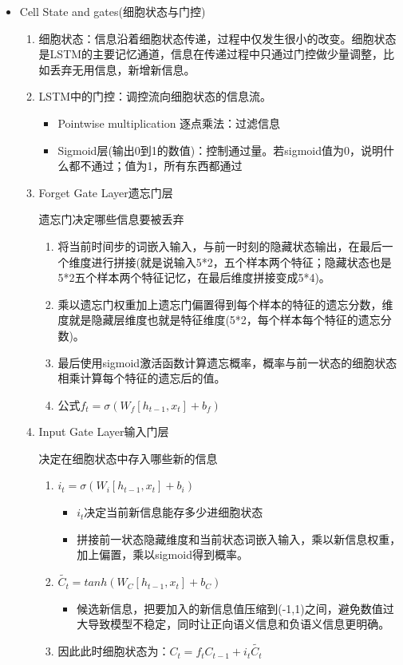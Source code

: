 \documentclass[UTF8]{ctexart}
\begin{document}
\begin{itemize}
    \item Cell State and gates(细胞状态与门控)
    
    \begin{enumerate}
        \item 细胞状态：信息沿着细胞状态传递，过程中仅发生很小的改变。细胞状态是LSTM的主要记忆通道，信息在传递过程中只通过门控做少量调整，比如丢弃无用信息，新增新信息。
        \item LSTM中的门控：调控流向细胞状态的信息流。
        \begin{itemize}
            \item Pointwise multiplication 逐点乘法：过滤信息
            \item Sigmoid层(输出0到1的数值)：控制通过量。若sigmoid值为0，说明什么都不通过；值为1，所有东西都通过
        \end{itemize}
        \item Forget Gate Layer遗忘门层
        
        遗忘门决定哪些信息要被丢弃
        \begin{enumerate}
            \item 将当前时间步的词嵌入输入，与前一时刻的隐藏状态输出，在最后一个维度进行拼接(就是说输入5*2，五个样本两个特征；隐藏状态也是5*2五个样本两个特征记忆，在最后维度拼接变成5*4)。
            \item 乘以遗忘门权重加上遗忘门偏置得到每个样本的特征的遗忘分数，维度就是隐藏层维度也就是特征维度(5*2，每个样本每个特征的遗忘分数)。
            \item 最后使用sigmoid激活函数计算遗忘概率，概率与前一状态的细胞状态相乘计算每个特征的遗忘后的值。
            \item 公式$f_{t}=\sigma(W_{f}[h_{t-1},x_{t}]+b_{f})$
        \end{enumerate}

        \item Input Gate Layer输入门层
        
        决定在细胞状态中存入哪些新的信息

        \begin{enumerate}
            \item $i_{t}=\sigma(W_{i}[h_{t-1},x_{t}]+b_{i})$
            \begin{itemize}
                \item $i_{t}$决定当前新信息能存多少进细胞状态
                \item 拼接前一状态隐藏维度和当前状态词嵌入输入，乘以新信息权重，加上偏置，乘以sigmoid得到概率。
            \end{itemize}
            \item $\tilde{C_{t}}=tanh(W_{C}[h_{t-1},x_{t}]+b_{C}) $
            \begin{itemize}
                \item 候选新信息，把要加入的新信息值压缩到(-1,1)之间，避免数值过大导致模型不稳定，同时让正向语义信息和负语义信息更明确。
            \end{itemize}
            \item 因此此时细胞状态为：$C_{t}=f_{t}C_{t-1}+i_{t}\tilde{C_{t}}$
        \end{enumerate}
        

\end{enumerate}
\end{itemize}
\end{document}
